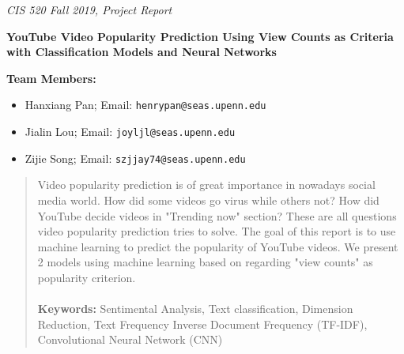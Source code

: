 \documentclass[english]{article}
\begin{document}


\emph{\footnotesize{CIS 520 Fall 2019, Project Report}}

\vspace{12pt}



\textbf{\Large{YouTube Video Popularity Prediction Using View Counts as Criteria with Classification Models and Neural Networks}}

\vspace{1cm}

\textbf{Team Members:}

\begin{itemize}
 \item Hanxiang Pan; Email: \texttt{henrypan@seas.upenn.edu}
 \item Jialin Lou; Email: \texttt{joyljl@seas.upenn.edu}
 \item Zijie Song; Email: \texttt{szjjay74@seas.upenn.edu} 
\end{itemize}

\hline


\begin{abstract}
Video popularity prediction is of great importance in nowadays social media world. How did some videos go virus while others not? How did YouTube decide videos in "Trending now" section? These are all questions video popularity prediction tries to solve. The goal of this report is to use machine learning to predict the popularity of YouTube videos. We present 2 models using machine learning based on regarding "view counts" as popularity criterion. \\\\
\textbf{Keywords:} Sentimental Analysis, Text classification, Dimension Reduction, Text Frequency Inverse Document Frequency (TF-IDF), Convolutional Neural Network (CNN)
\end{abstract}
\end{document}
